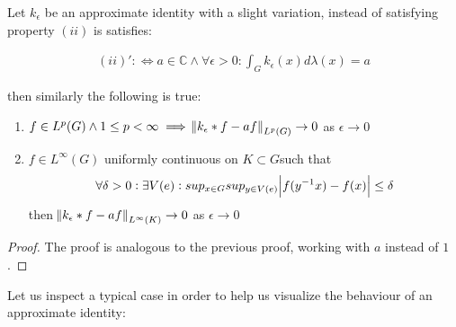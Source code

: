 \begin{theorem}
Let $k_\epsilon$ be an approximate identity with a slight variation, instead of satisfying property $(ii)$ is satisfies:

\begin{align*}
(ii)' :\Leftrightarrow a\in \mathbb{C} \wedge \forall \epsilon > 0 : \int_G k_\epsilon(x) d\lambda(x) = a 
\end{align*}

then similarly the following is true:

\begin{enumerate}
\item $f \in L^p(G) \wedge 1 \leq p < \infty \implies \norm{k_\epsilon \ast f - af}_{L^p(G)} \to 0 $ as $ \epsilon \to 0$
\item $f \in L^\infty(G)$ uniformly continuous on $K \subset G $such that 
\begin{align*}
\forall \delta>0: \exists V(e): sup_{x\in G}sup_{y \in V(e)}\abs{f(y^{-1}x)-f(x)}\leq \delta
\end{align*}
 then $ \norm{k_\epsilon \ast f - af}_{L^\infty(K)} \to 0$ as $\epsilon \to 0$  
\end{enumerate}

\end{theorem}

\begin{proof}
The proof is analogous to the previous proof, working with $a$ instead of $1$.\end{proof}

Let us inspect a typical case in order to help us visualize the behaviour of an approximate identity:

